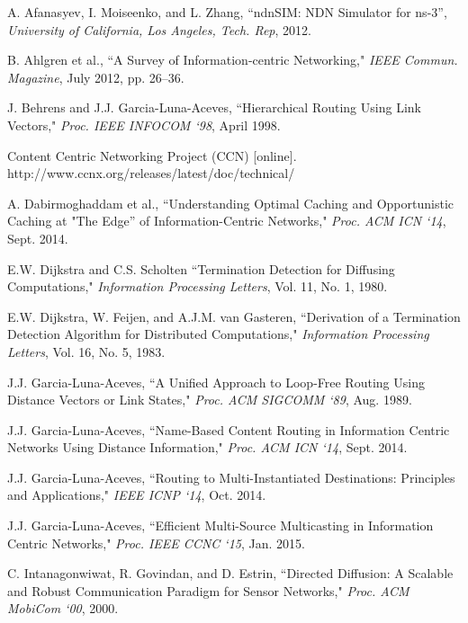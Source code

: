 \documentclass{ancs15-alternate}
\begin{document}
\begin{thebibliography}{99}
\vspace{0.01in}

A. Afanasyev, I. Moiseenko, and L. Zhang, ``ndnSIM: NDN Simulator for ns-3'', {\em University of California, Los Angeles, Tech. Rep}, 2012.


B. Ahlgren et al., ``A Survey of Information-centric Networking,"  
{\em IEEE Commun. Magazine}, July 2012, pp. 26--36.


J. Behrens and J.J. Garcia-Luna-Aceves, ``Hierarchical Routing Using Link Vectors,"
{\em Proc. IEEE INFOCOM `98}, April 1998.

Content Centric Networking Project (CCN) [online]. \\
http://www.ccnx.org/releases/latest/doc/technical/

A. Dabirmoghaddam et al., ``Understanding Optimal Caching and Opportunistic Caching at "The Edge'' of Information-Centric Networks,"
{\em Proc. ACM ICN `14},  Sept.  2014.

E.W. Dijkstra and C.S. Scholten ``Termination Detection for Diffusing Computations," {\em Information Processing Letters}, Vol. 11, No. 1, 1980.

E.W. Dijkstra, W. Feijen, and A.J.M. van Gasteren, ``Derivation of a Termination Detection Algorithm for Distributed Computations," 
{\em Information Processing Letters},  Vol. 16, No. 5, 1983.


J.J. Garcia-Luna-Aceves,
``A Unified Approach to Loop-Free Routing Using Distance Vectors or Link States,"
{\em Proc. ACM SIGCOMM `89}, Aug. 1989.

J.J. Garcia-Luna-Aceves, ``Name-Based Content Routing in Information Centric Networks Using Distance Information,"
{\em Proc. ACM ICN  `14},  Sept.  2014.

J.J. Garcia-Luna-Aceves, ``Routing to Multi-Instantiated Destinations: Principles and Applications,"
{\em IEEE ICNP `14}, Oct. 2014.

J.J. Garcia-Luna-Aceves, ``Efficient Multi-Source Multicasting in Information Centric Networks,"
{\em Proc. IEEE CCNC  `15},  Jan.  2015.

C. Intanagonwiwat, R. Govindan, and D. Estrin, ``Directed Diffusion: A Scalable and Robust Communication Paradigm for Sensor Networks,"
{\em Proc. ACM MobiCom `00}, 2000.


\end{thebibliography}
\end{document}
